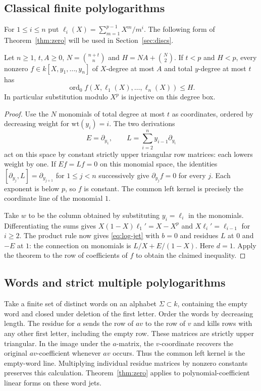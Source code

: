 \subsection{Classical finite polylogarithms}
For $1\le i\le n$ put $\ell_i(X)=\sum_{m=1}^{p-1}X^m/m^i$.
The following form of Theorem~\ref{thm:zero} will be used in
Section~\ref{sec:discs}.

\begin{corollary}\label{cor:box}
Let $n\ge1$, $t,A\ge0$, $N=\binom{n+t}{n}$ and
$H=NA+\binom N2$. If $t<p$ and $H<p$, every nonzero
$f\in k[X,y_1,\ldots,y_n]$ of $X$-degree at most $A$ and total
$y$-degree at most $t$ has
\[
 \operatorname{ord}_0 f(X,\ell_1(X),\ldots,\ell_n(X))\le H.
\]
In particular substitution modulo $X^p$ is injective on this degree box.
\end{corollary}

\begin{proof}
Use the $N$ monomials of total degree at most $t$ as coordinates,
ordered by decreasing weight for $\mathrm{wt}(y_i)=i$.
The two derivations
\[
 E=\partial_{y_1},\qquad L=\sum_{i=2}^n y_{i-1}\partial_{y_i}
\]
act on this space by constant strictly upper triangular row matrices:
each lowers weight by one. If $Ef=Lf=0$ on this monomial space, the
identities $[\partial_{y_j},L]=\partial_{y_{j+1}}$ for $1\le j<n$
successively give $\partial_{y_j}f=0$ for every $j$. Each exponent
is below $p$, so $f$ is constant. The common left kernel is precisely
the coordinate line of the monomial $1$.

Take $w$ to be the column obtained by substituting $y_i=\ell_i$ in the
monomials. Differentiating the sums gives
$X(1-X)\ell_1'=X-X^p$ and $X\ell_i'=\ell_{i-1}$ for $i\ge2$.
The product rule now gives \eqref{eq:log-jet} with $b=0$ and residues
$L$ at $0$ and $-E$ at $1$: the connection on monomials is
$L/X+E/(1-X)$. Here $d=1$. Apply the theorem to the row of
coefficients of $f$ to obtain the claimed inequality.
\end{proof}

\subsection{Words and strict multiple polylogarithms}
Take a finite set of distinct words on an alphabet $\Sigma\subset k$,
containing the empty word and closed under deletion of the first letter.
Order the words by decreasing length. The residue for $a$ sends the row
of $av$ to the row of $v$ and kills rows with any other first letter,
including the empty row. These matrices are strictly upper triangular.
In the image under the $a$-matrix, the $v$-coordinate recovers the
original $av$-coefficient whenever $av$ occurs. Thus the common left
kernel is the empty-word line. Multiplying individual residue matrices
by nonzero constants preserves this calculation. Theorem~\ref{thm:zero}
applies to polynomial-coefficient linear forms on these word jets.

